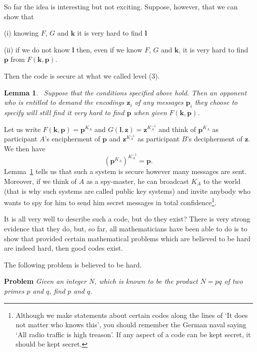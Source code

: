 \documentclass[12pt,a4paper]{article}
\theoremstyle{plain}
\newtheorem{lemma}[theorem]{Lemma}
\theoremstyle{definition}
\begin{document}
    So far the idea is interesting but not exciting.
    Suppose, however, that we can show that

    (i) knowing $F$, $G$ and $\mathbf k$
    it is very hard to find ${\mathbf l}$

    (ii) if we do not know ${\mathbf l}$ then, even if we know $F$, $G$
    and ${\mathbf k}$, it is very hard to find ${\mathbf p}$
    from $F({\mathbf k},{\mathbf p})$.

    \noindent
    Then the code is secure at what we called level (3).
    \begin{lemma}
        ~\label{level 3}
        Suppose that the conditions specified
        above hold. Then an opponent who is entitled to
        demand the encodings ${\mathbf z}_{i}$ of
        any messages ${\mathbf p}_{i}$ they choose
        to specify will still find it very hard to find
        $\mathbf{p}$ when given
        $F({\mathbf k},{\mathbf p})$.
    \end{lemma}

    Let us write $F({\mathbf k},{\mathbf p})={\mathbf p}^{K_{A}}$
    and $G({\mathbf l},{\mathbf z})={\mathbf z}^{K_{A}^{-1}}$
    and think of ${\mathbf p}^{K_{A}}$ as participant
    $A$'s encipherment of $\mathbf{p}$ and
    ${\mathbf z}^{K_{A}^{-1}}$ as participant $B$'s
    decipherment of ${\mathbf z}$. We then have
    \[({\mathbf p}^{K_{A}})^{K_{A}^{-1}}={\mathbf p}.\]
    Lemma~\ref{level 3} tells us that such a system
    is secure however many messages are sent.
    Moreover, if we think of $A$ as a spy-master,
    he can broadcast $K_{A}$ to the world (that
    is why such systems are called public key
    systems) and invite anybody who
    wants to spy for him to send him secret messages
    in total confidence\footnote{Although we
    make statements about certain codes along the lines
    of `It does not matter who knows this', you
    should remember the German naval saying
    `All radio traffic is high treason'. If
    any aspect of a code can be
    kept secret, it should be kept secret.}.

    It is all very well to describe such a code,
    but do they exist? There is very strong evidence
    that they do, but, so far, all mathematicians
    have been able to do is to show that
    provided certain mathematical problems which
    are believed to be hard are indeed hard,
    then good codes exist.

    The following problem is believed to be hard.

    \noindent
    {\bf Problem} \emph{Given an integer $N$, which is
    known to be the product $N=pq$ of two primes
    $p$ and $q$, find $p$ and $q$.}
\end{document}

